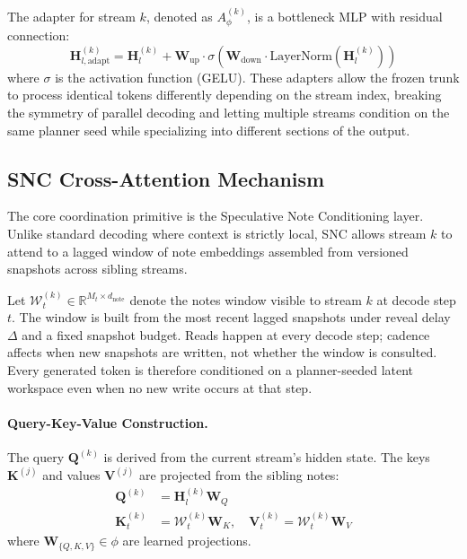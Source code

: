 The adapter for stream $k$, denoted as $A_{\phi}^{(k)}$, is a bottleneck MLP with residual connection:
\begin{equation}
    \mathbf{H}^{(k)}_{l, \text{adapt}} = \mathbf{H}^{(k)}_l + \mathbf{W}_{\text{up}} \cdot \sigma(\mathbf{W}_{\text{down}} \cdot \text{LayerNorm}(\mathbf{H}^{(k)}_l))
\end{equation}
where $\sigma$ is the activation function (GELU). These adapters allow the frozen trunk to process identical tokens differently depending on the stream index, breaking the symmetry of parallel decoding and letting multiple streams condition on the same planner seed while specializing into different sections of the output.

\subsection{SNC Cross-Attention Mechanism}
\label{sec:snc_attention}

The core coordination primitive is the Speculative Note Conditioning layer. Unlike standard decoding where context is strictly local, SNC allows stream $k$ to attend to a lagged window of note embeddings assembled from versioned snapshots across sibling streams.

Let $\mathcal{W}^{(k)}_t \in \mathbb{R}^{M_t \times d_{\text{note}}}$ denote the notes window visible to stream $k$ at decode step $t$. The window is built from the most recent lagged snapshots under reveal delay $\Delta$ and a fixed snapshot budget. Reads happen at every decode step; cadence affects when new snapshots are written, not whether the window is consulted. Every generated token is therefore conditioned on a planner-seeded latent workspace even when no new write occurs at that step.

\paragraph{Query-Key-Value Construction.}
The query $\mathbf{Q}^{(k)}$ is derived from the current stream's hidden state. The keys $\mathbf{K}^{(j)}$ and values $\mathbf{V}^{(j)}$ are projected from the sibling notes:
\begin{align}
    \mathbf{Q}^{(k)} &= \mathbf{H}^{(k)}_{l} \mathbf{W}_Q \\
    \mathbf{K}^{(k)}_t &= \mathcal{W}^{(k)}_t \mathbf{W}_K, \quad \mathbf{V}^{(k)}_t = \mathcal{W}^{(k)}_t \mathbf{W}_V
\end{align}
where $\mathbf{W}_{\{Q,K,V\}} \in \phi$ are learned projections.

